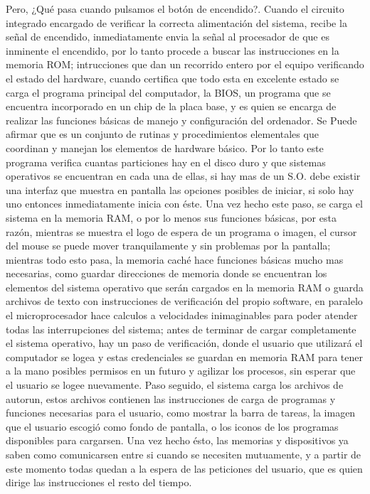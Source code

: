 \documentclass{article}
\begin{document}
Pero, ¿Qué pasa cuando pulsamos el botón de encendido?. 
Cuando el circuito integrado encargado de verificar la correcta alimentación del sistema, recibe la señal de encendido, inmediatamente envia la señal al procesador de que es inminente el encendido, por lo tanto procede a buscar las instrucciones en la memoria ROM; intrucciones que dan un recorrido entero por el equipo verificando el estado del hardware, cuando certifica que todo esta en excelente estado se carga el programa principal del computador, la BIOS, un programa que se encuentra incorporado en un chip de la placa base, y es quien se encarga de  realizar las funciones básicas de manejo y configuración del ordenador. Se Puede afirmar que es un conjunto de rutinas y procedimientos elementales que coordinan y manejan los elementos de hardware básico.
Por lo tanto este programa verifica cuantas particiones hay en el disco duro y que sistemas operativos se encuentran en cada una de ellas, si hay mas de un S.O. debe existir una interfaz que muestra en pantalla las opciones posibles de iniciar, si solo hay uno entonces inmediatamente inicia con éste. Una vez hecho este paso, se carga el sistema en la memoria RAM, o por lo menos sus funciones básicas, por esta razón, mientras se muestra el logo de espera de un programa o imagen, el cursor del mouse se puede mover tranquilamente y sin problemas por la pantalla; mientras todo esto pasa, la memoria caché hace funciones básicas mucho mas necesarias, como guardar direcciones de memoria donde se encuentran los elementos del sistema operativo que serán cargados en la memoria RAM o guarda archivos de texto con instrucciones de verificación del propio software, en paralelo el microprocesador hace calculos a velocidades inimaginables para poder atender todas las interrupciones del sistema; antes de terminar de cargar completamente el sistema operativo, hay un paso de verificación, donde el usuario que utilizará el computador se logea y estas credenciales se guardan en memoria RAM para tener a la mano posibles permisos en un futuro y agilizar los procesos, sin esperar que el usuario se logee nuevamente. Paso seguido, el sistema carga los archivos de autorun, estos archivos contienen las instrucciones de carga de programas y funciones necesarias para el usuario, como mostrar la barra de tareas, la imagen que el usuario escogió como fondo de pantalla, o los iconos de los programas disponibles para cargarsen. Una vez hecho ésto, las memorias y dispositivos ya saben como comunicarsen entre si cuando se necesiten mutuamente, y a partir de este momento todas quedan a la espera de las peticiones del usuario, que es quien dirige las instrucciones el resto del tiempo.
\end{document}
